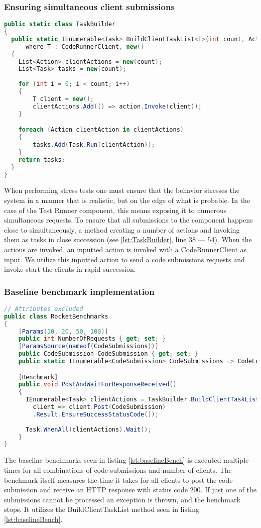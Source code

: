 \subsubsection{Ensuring simultaneous client submissions}
\begin{lstlisting}[language=cs, escapechar=~, caption={C\# code showing xxxxxx}, label={lst:TaskBuilder}]
public static class TaskBuilder
{
  public static IEnumerable<Task> BuildClientTaskList<T>(int count, Action<T> action)
      where T : CodeRunnerClient, new()
  {
    List<Action> clientActions = new(count);
    List<Task> tasks = new(count);
    
    for (int i = 0; i < count; i++)
    {
        T client = new();
        clientActions.Add(() => action.Invoke(client));
    }

    foreach (Action clientAction in clientActions)
    {
        tasks.Add(Task.Run(clientAction));
    }
    return tasks;
  }
}
\end{lstlisting}
When performing stress tests one must ensure that the behavior stresses the system in a manner that is realistic, but on the edge of what is probable.
In the case of the Test Runner component, this means exposing it to numerous simultaneous requests. 
To ensure that all submissions to the component happens close to simultaneously, a method creating a number of actions and invoking them as tasks in close succession (see \ref{lst:TaskBuilder}, line 38 --- 54). 
When the actions are invoked, an inputted action is invoked with a CodeRunnerClient as input. 
We utilize this inputted action to send a code submissions requests and invoke start the clients in rapid succession.


\subsubsection{Baseline benchmark implementation}
\begin{lstlisting}[language=cs, escapechar=~, caption={C\# code showing xxxxxx}, label={lst:baselineBench}]
// Attributes excluded
public class RocketBenchmarks
{
    [Params(10, 20, 50, 100)] 
    public int NumberOfRequests { get; set; }
    [ParamsSource(nameof(CodeSubmissions))]
    public CodeSubmission CodeSubmission { get; set; }
    public static IEnumerable<CodeSubmission> CodeSubmissions => CodeLoader.Load();

    [Benchmark]
    public void PostAndWaitForResponseReceived()
    {
      IEnumerable<Task> clientActions = TaskBuilder.BuildClientTaskList<CodeRunnerClient>(NumberOfRequests,
        client => client.Post(CodeSubmission)
        .Result.EnsureSuccessStatusCode());
        
      Task.WhenAll(clientActions).Wait();
    }
}
\end{lstlisting}
The baseline benchmarks seen in listing \ref{lst:baselineBench} is executed multiple times for all combinations of code submissions and number of clients.
The benchmark itself measures the time it takes for all clients to post the code submission and receive an HTTP response with status code 200.
If just one of the submissions cannot be processed an exception is thrown, and the benchmark stops.
It utilizes the BuildClientTaskList method seen in listing \ref{lst:baselineBench}.

